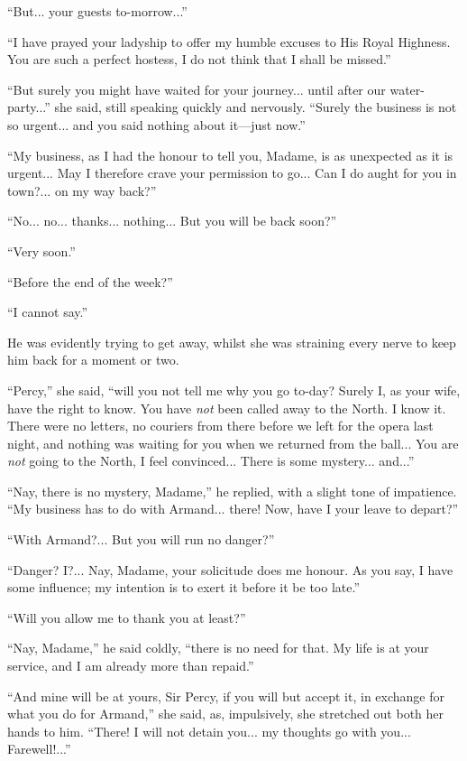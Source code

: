 \documentclass[paper=a5,BCOR=7mm,twoside,DIV=calc,12pt,usegeometry,chapterprefix,endperiod,headings=big]{scrbook}
\begin{document}
\enquote{But... your guests to-morrow...}

\enquote{I have prayed your ladyship to offer my humble excuses to His Royal Highness. You are such a perfect hostess, I do not think that I shall be missed.}

\enquote{But surely you might have waited for your journey... until after our water-party...} she said, still speaking quickly and nervously. \enquote{Surely the business is not so urgent... and you said nothing about it---just now.}

\enquote{My business, as I had the honour to tell you, Madame, is as unexpected as it is urgent... May I therefore crave your permission to go... Can I do aught for you in town?... on my way back?}

\enquote{No... no... thanks... nothing... But you will be back soon?}

\enquote{Very soon.}

\enquote{Before the end of the week?}

\enquote{I cannot say.}

He was evidently trying to get away, whilst she was straining every nerve to keep him back for a moment or two.

\enquote{Percy,} she said, \enquote{will you not tell me why you go to-day? Surely I, as your wife, have the right to know. You have \textit{not} been called away to the North. I know it. There were no letters, no couriers from there before we left for the opera last night, and nothing was waiting for you when we returned from the ball... You are \textit{not} going to the North, I feel convinced... There is some mystery... and...}

\enquote{Nay, there is no mystery, Madame,} he replied, with a slight tone of impatience. \enquote{My business has to do with Armand... there! Now, have I your leave to depart?}

\enquote{With Armand?... But you will run no danger?}

\enquote{Danger? I?... Nay, Madame, your solicitude does me honour. As you say, I have some influence; my intention is to exert it before it be too late.}

\enquote{Will you allow me to thank you at least?}

\enquote{Nay, Madame,} he said coldly, \enquote{there is no need for that. My life is at your service, and I am already more than repaid.}

\enquote{And mine will be at yours, Sir Percy, if you will but accept it, in exchange for what you do for Armand,} she said, as, impulsively, she stretched out both her hands to him. \enquote{There! I will not detain you... my thoughts go with you... Farewell!...}
\end{document}
